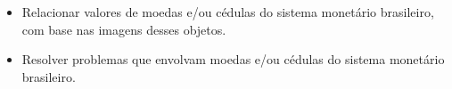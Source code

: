 \begin{itemize}
\item Relacionar valores de moedas e/ou cédulas do sistema monetário
brasileiro, com base nas imagens desses objetos.

\item Resolver problemas que envolvam moedas e/ou cédulas do sistema
monetário brasileiro.
\end{itemize}

